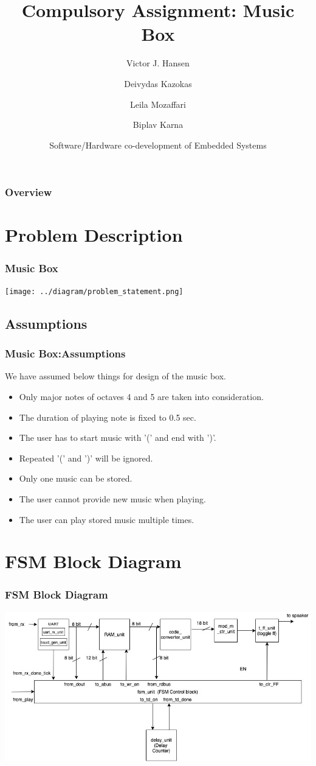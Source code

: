 \documentclass{beamer}
\title{Compulsory Assignment: Music Box}
\author[Victor, Deivydas, Leila, Biplav]{Victor J. Hansen\inst{1}
\and Deivydas Kazokas\inst{2} \break
\and Leila Mozaffari\inst{3}
\and Biplav Karna\inst{4}
}
\institute{USN Kongsberg}
\date[ES-SHC4300,Feb 2020]{ Software/Hardware co-development of Embedded Systems }
\begin{document}
 
\frame{\titlepage}
 
\begin{frame}
\frametitle{Overview}
\tableofcontents
\end{frame}

\section{Problem Description}
\begin{frame}
\frametitle{Music Box}
\texttt{[image: ../diagram/problem\_statement.png]}
\end{frame}
 
\subsection{Assumptions}
\begin{frame}
\frametitle{Music Box:Assumptions}
We have assumed below things for design of the music box.
\begin{itemize}
\item Only major notes of octaves 4 and 5 are taken into consideration.
\item The duration of playing note is fixed to 0.5 sec.
\item The user has to start music with '(' and end with ')'.
\item Repeated '(' and ')' will be ignored.
\item Only one music can be stored.
\item The user cannot provide new music when playing.
\item The user can play stored music multiple times.
\end {itemize}
\end{frame}

\section{FSM Block Diagram}
\begin{frame}
\frametitle{FSM Block Diagram}
\includegraphics[width=\textwidth,height=0.8\textheight] {../diagram/ccw_music_player-fsm_block_diagram.jpg}
\end{frame}
 
\end{document}
